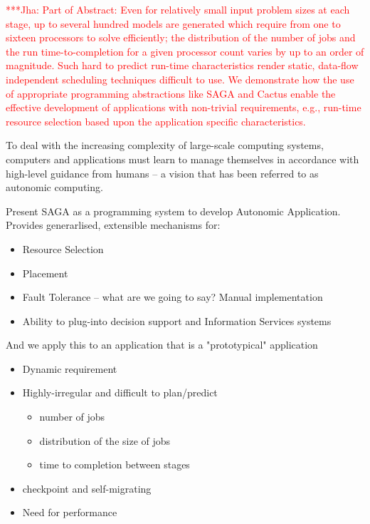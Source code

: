 \documentclass[conference,final]{IEEEtran}
\newcommand{\jhanote}[1]{ {\textcolor{red} { ***Jha: #1 }}}
\begin{document}
\jhanote{Part of Abstract: Even for relatively small input problem
  sizes at each stage, up to several hundred models are generated
  which require from one to sixteen processors to solve efficiently;
  the distribution of the number of jobs and the run
  time-to-completion for a given processor count varies by up to an
  order of magnitude.  Such hard to predict run-time characteristics
  render static, data-flow independent scheduling techniques difficult
  to use.  We demonstrate how the use of appropriate programming
  abstractions like SAGA and Cactus enable the effective development
  of applications with non-trivial requirements, e.g., run-time
  resource selection based upon the application specific
  characteristics.}

To deal with the increasing complexity of large-scale computing
systems, computers and applications must learn to manage themselves in
accordance with high-level guidance from humans -- a vision that has
been referred to as autonomic computing.

Present SAGA as a programming system to develop Autonomic Application.
Provides generarlised, extensible mechanisms  for:
\begin{itemize}
\item  Resource Selection
\item  Placement
\item  Fault Tolerance -- what are we going to say? Manual implementation
\item Ability to plug-into decision support and Information Services
  systems
\end{itemize}

And we apply this to an application that is a "prototypical"
application

\begin{itemize} 
\item Dynamic requirement
\item Highly-irregular and  difficult to plan/predict
\begin{itemize} 
  \item number of jobs
  \item distribution of the size of jobs
  \item time to completion between stages
\end{itemize} 
\item checkpoint and self-migrating 
\item Need for performance 
\end{itemize} 
\end{document}
